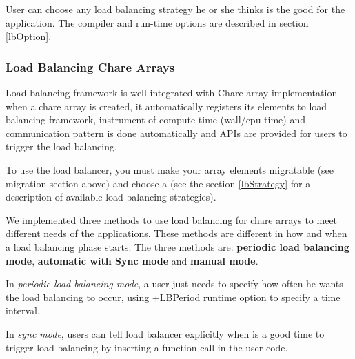User can choose any load balancing strategy he or she thinks is the good
for the application. 
The compiler and run-time options
are described in section \ref{lbOption}.


\subsubsection{Load Balancing Chare Arrays}
\label{lbarray}

Load balancing framework is well integrated with Chare array implementation - 
when a chare array is created, it  automatically registers its elements 
to load balancing framework, instrument of compute time (wall/cpu time) 
and communication pattern is done automatically and APIs are provided 
for users to trigger the load balancing. 

To use the load balancer, you must make your array elements migratable
(see migration section above) and choose a  
(see the section \ref{lbStrategy} for a description
of available load balancing strategies).

We implemented three methods to use load balancing for chare arrays
to meet different needs of the applications. These methods
are different in how and when a load balancing phase starts.
The three methods are: {\bf periodic load balancing mode}, 
{\bf automatic with Sync mode} and {\bf manual mode}.

In {\em periodic load balancing mode}, a user just needs to specify how
often he wants the load balancing to occur, using +LBPeriod runtime
option to specify a time interval. 

In {\em sync mode}, users can tell load balancer explicitly when is a good 
time to trigger load balancing by inserting a function call in the user
code.


